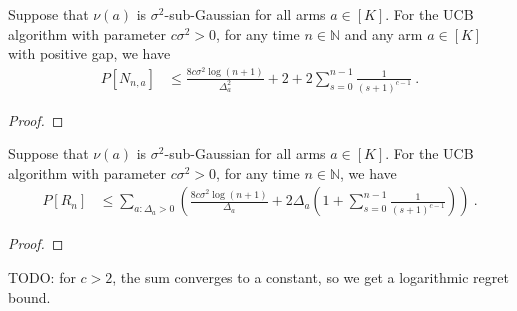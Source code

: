 \begin{lemma}\label{lem:expectation_pullCount_le}
  \leanok
Suppose that $\nu(a)$ is $\sigma^2$-sub-Gaussian for all arms $a \in [K]$.
For the UCB algorithm with parameter $c \sigma^2 > 0$, for any time $n \in \mathbb{N}$ and any arm $a \in [K]$ with positive gap, we have
\begin{align*}
  P[N_{n,a}]
  &\le \frac{8 c \sigma^2 \log(n + 1)}{\Delta_a^2} + 2 + 2 \sum_{s=0}^{n-1} \frac{1}{(s + 1)^{c - 1}}
  \: .
\end{align*}
\end{lemma}

\begin{proof}\leanok

\end{proof}


\begin{lemma}\label{lem:ucb_regret_le}
  \leanok
Suppose that $\nu(a)$ is $\sigma^2$-sub-Gaussian for all arms $a \in [K]$.
For the UCB algorithm with parameter $c \sigma^2 > 0$, for any time $n \in \mathbb{N}$, we have
\begin{align*}
  P[R_n]
  &\le \sum_{a : \Delta_a > 0} \left(\frac{8 c \sigma^2 \log(n + 1)}{\Delta_a} + 2 \Delta_a\left(1 + \sum_{s=0}^{n-1} \frac{1}{(s + 1)^{c - 1}}\right)\right)
  \: .
\end{align*}
\end{lemma}

\begin{proof}\leanok

\end{proof}

TODO: for $c > 2$, the sum converges to a constant, so we get a logarithmic regret bound.
